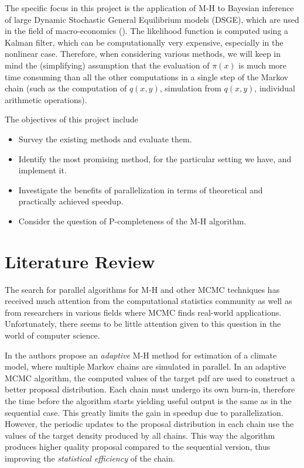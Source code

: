 \documentclass[11pt,letterpaper]{article}       %
\begin{document}
The specific focus in this project is the application of M-H to Bayesian
inference of large Dynamic Stochastic General Equilibrium models (DSGE), which
are used in the field of macro-economics (\cite{strid2010adaptive}).  The
likelihood function is computed using a Kalman filter, which can be
computationally very expensive, especially in the nonlinear case.  Therefore,
when considering various methods, we will keep in mind the (simplifying)
assumption that the evaluation of $\pi(x)$ is much more time consuming than all
the other computations in a single step of the Markov chain (such as the
computation of $q(x,y)$, simulation from $q(x,y)$, individual arithmetic
operations). 

The objectives of this project include
\begin{itemize}
\item Survey the existing methods and evaluate them.
\item Identify the most promising method, for the particular setting we have, and implement it.
\item Investigate the benefits of parallelization in terms of theoretical and
     practically achieved speedup.
\item Consider the question of P-completeness of the M-H algorithm.
\end{itemize}



\section{Literature Review} \label{litrev}

The search for parallel algorithms for M-H and other MCMC techniques has received
much attention from the computational statistics community as well as from 
researchers in various fields where MCMC finds real-world applications.  
Unfortunately, there seems to be little attention given to this question 
in the world of computer science.

In \cite{solonen2012efficient} the authors propose an \emph{adaptive} M-H
method for estimation of a climate model, where multiple Markov chains are
simulated in parallel.  In an adaptive MCMC algorithm, the computed values of
the target pdf are used to construct a better proposal distribution.  Each
chain must undergo its own burn-in, therefore the time before the algorithm
starts yielding useful output is the same as in the sequential case.  This
greatly limits the gain in speedup due to parallelization.  However, the
periodic updates to the proposal distribution in each chain use the values of
the target density produced by all chains.  This way the algorithm produces
higher quality proposal compared to the sequential version, thus improving the
\emph{statistical efficiency} of the chain.
\end{document}
